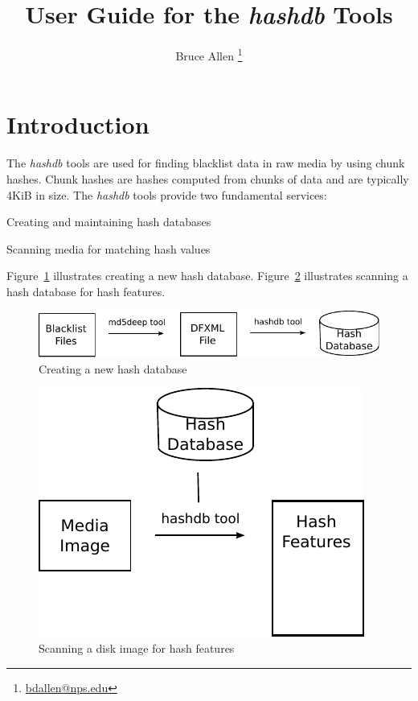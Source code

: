 \documentclass[11pt,twoside]{article}
\newcommand \hdb {\textit{hashdb}\xspace}
\begin{document}
\title{User Guide for the \hdb Tools}
\author{Bruce Allen \footnote{\href{mailto:bdallen@nps.edu}{bdallen@nps.edu}}}
\maketitle

\section{Introduction}
The \hdb tools are used for finding blacklist data in raw media
by using chunk hashes.
Chunk hashes are hashes computed from chunks of data
and are typically 4KiB in size.
The \hdb tools provide two fundamental services:
\begin{compactitem}
	\item Creating and maintaining hash databases
	\item Scanning media for matching hash values
\end{compactitem}

Figure~\ref{fig:create_hashdb} illustrates creating a new hash database.
Figure~\ref{fig:scan_hashdb} illustrates scanning a hash database
for hash features.
\begin{figure}[h]
	\center
	\includegraphics[scale=1.0]{drawings/create_hashdb.pdf}
	\caption{Creating a new hash database}
	\label{fig:create_hashdb}
\end{figure}
\begin{figure}[h]
	\center
	\includegraphics[scale=1.0]{drawings/scan_hashdb.pdf}
	\caption{Scanning a disk image for hash features}
	\label{fig:scan_hashdb}
\end{figure}
\end{document}
